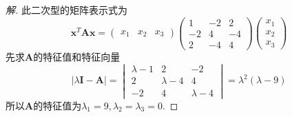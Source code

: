\documentclass[10pt,a4paper]{report}
\def\*#1{\mathbf{#1}}
\begin{document}
\begin{proof}[解]
	此二次型的矩阵表示式为
	\[ \*x^T\*A\*x = \begin{pmatrix}
	x_1 & x_2 & x_3
	\end{pmatrix}\begin{pmatrix}
	1 & -2 & 2 \\
	-2 & 4 & -4 \\
	2 & -4 & 4
	\end{pmatrix}\begin{pmatrix}
	x_1 \\
	x_2 \\
	x_3
	\end{pmatrix} \]
	先求$\*A$的特征值和特征向量
	\[ |\lambda\*I - \*A | = \begin{vmatrix}
	\lambda - 1 & 2 & -2 \\
	2 & \lambda - 4 & 4 \\
	-2 & 4 & \lambda - 4
	\end{vmatrix} = \lambda^2(\lambda - 9) \]
	所以$\*A$的特征值为$\lambda_1 = 9, \lambda_2=\lambda_3 = 0$.
	

\end{proof}
\end{document}
